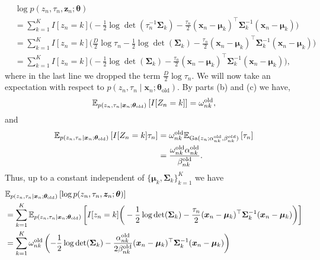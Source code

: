 \begin{enumerate}[label = (\alph*)]
\begin{align*}
        &\log p(z_n,\tau_n,\bm{z}_n;\bm{\theta})\\
        &=\sum_{k=1}^K I[z_n = k]\bigg(-\frac{1}{2}\log \det(\tau_n^{-1}\bm{\Sigma}_k) - \frac{\tau_n}{2}(\bm{x}_n - \bm{\mu}_k)^\top \bm{\Sigma}_k^{-1}(\bm{x}_n - \bm{\mu}_k) \bigg)\\
        &=\sum_{k=1}^K I[z_n = k]\bigg(\frac{D}{2}\log\tau_n-\frac{1}{2}\log \det(\bm{\Sigma}_k) - \frac{\tau_n}{2}(\bm{x}_n - \bm{\mu}_k)^\top \bm{\Sigma}_k^{-1}(\bm{x}_n - \bm{\mu}_k) \bigg)\\
        &=\sum_{k=1}^K I[z_n = k]\bigg(-\frac{1}{2}\log \det(\bm{\Sigma}_k) - \frac{\tau_n}{2}(\bm{x}_n - \bm{\mu}_k)^\top \bm{\Sigma}_k^{-1}(\bm{x}_n - \bm{\mu}_k) \bigg),
    \end{align*}
    where in the last line we dropped the term $\frac{D}{2}\log\tau_n$. We will now take an expectation with respect to $p(z_n,\tau_n\mid \bm{x}_n ;\bm{\theta}_{\mathrm{old}})$. By parts (b) and (c) we have,
    \begin{align*}
        {\mathbb E}_{p(z_n, \tau_n \mid \bm{x}_n;\bm{\theta}_{\mathrm{old}})}\left[I[Z_n = k]\right] = \omega_{nk}^{\mathrm{old}},
    \end{align*}
    and 
    \begin{align*}
    {\mathbb E}_{p(z_n,\tau_n \mid \bm{x}_n;\bm{\theta}_{\mathrm{old}})}\left[I[Z_n=k]\tau_n\right]
        &=\omega_{nk}^{\mathrm{old}}{\mathbb E}_{\mathrm{Ga}(z_n;\alpha_{nk}^{\text{old}}, \beta_{nk}^{old})}\left[\tau_n\right]\\
        &= \frac{\omega_{nk}^{\mathrm{old}}\alpha_{nk}^{\text{old}}}{\beta_{nk}^{\text{old}}}.
    \end{align*}
    Thus, up to a constant independent of $\{\bm{\mu}_k,\bm{\Sigma}_k\}_{k=1}^K$ we have
    \begin{align*}
        &{\mathbb E}_{p(z_n, \tau_n \mid \bm{x}_n;\bm{\theta}_{\mathrm{old}})}\left[\log p(z_n,\tau_n,\bm{z}_n;\bm{\theta})\right]\\
        &=\sum_{k=1}^K {\mathbb E}_{p(z_n, \tau_n \mid \bm{x}_n;\bm{\theta}_{\mathrm{old}})}\left[I[z_n = k]\bigg(-\frac{1}{2}\log \det(\bm{\Sigma}_k) - \frac{\tau_n}{2}(\bm{x}_n - \bm{\mu}_k)^\top \bm{\Sigma}_k^{-1}(\bm{x}_n - \bm{\mu}_k) \bigg)\right]\\
        &=\sum_{k=1}^K \omega_{nk}^{\mathrm{old}}\left(-\frac{1}{2}\log \det(\bm{\Sigma}_k) - \frac{\alpha_{nk}^{\mathrm{old}}}{2\beta_{nk}^{\mathrm{old}}}(\bm{x}_n - \bm{\mu}_k)^\top \bm{\Sigma}_k^{-1}(\bm{x}_n - \bm{\mu}_k) \right)
    \end{align*}

\end{enumerate}

